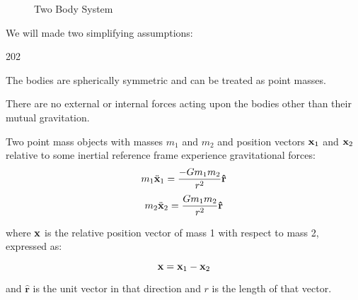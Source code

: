 \begin{figure}[h!]
    \caption{Two Body System}
\end{figure}

We will made two simplifying assumptions:

\begin{dingautolist}{202}
\item  The bodies are spherically symmetric and can be treated as point
masses.

\item There are no external or internal forces acting upon the bodies other
than their mutual gravitation.
\end{dingautolist}


Two point mass objects with masses $m_1$ and $m_2$ and position
vectors $\mathbf{ x}_1$ and $\mathbf{ x}_2$ relative to some
inertial reference frame experience
gravitational forces:
\[m_1 \ddot{\mathbf{ x}}_1 = \dfrac{-G m_1 m_2}{r^2} \mathbf{\hat{r}}\]
\[m_2 \ddot{\mathbf{ x}}_2 = \dfrac{G m_1 m_2}{r^2} \mathbf{\hat{r}}\]

where $\mathbf{ x}$ is the relative position vector of mass 1 with
respect to mass 2, expressed as:

\[\mathbf{ x} = \mathbf{ x}_1 - \mathbf{ x}_2\]

and $\mathbf{\hat{r}}$ is the unit vector in that
direction and $r$ is the length of
that vector.

